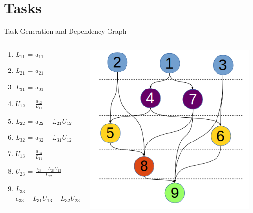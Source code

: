 \documentclass{beamer}
\begin{document}
\section{Tasks}
\begin{frame}{Task Generation and Dependency Graph}
\begin{columns}
\begin{column}{4cm}
\begin{enumerate}
\item $L_{11}$ = $a_{11}$
\item $L_{21}$ = $a_{21}$
\item $L_{31}$ = $a_{31}$
\item $U_{12}$ = $\frac{a_{12}}{L_{11}}$
\item $L_{22}$ = $a_{22} - L_{21}U_{12}$
\item $L_{32}$ = $a_{32} - L_{31}U_{12}$
\item $U_{13}$ = $\frac{a_{13}}{L_{11}}$
\item $U_{23}$ = $\frac{a_{23} - L_{23}U_{13}}{L_{22}}$
\item $L_{33}$ = $a_{33} - L_{31}U_{13} - L_{32}U_{23}$
\end{enumerate}
\end{column}
\begin{column}{7cm}
\includegraphics[scale=.5]{taskdep.png}
\end{column}
\end{columns}
\end{frame}
\end{document}
